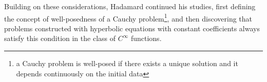 Building on these considerations, Hadamard continued his studies, first defining the concept of well-posedness of a Cauchy problem\footnote{a Cauchy problem is well-posed if there exists a unique solution and it depends continuously on the initial data}, and then discovering that problems constructed with hyperbolic equations with constant coefficients always satisfy this condition in the class of $C^\infty$ functions.
